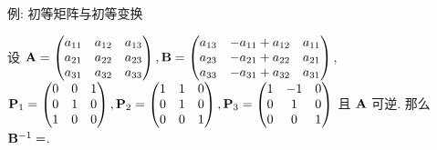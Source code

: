 \begin{frame}{例: 初等矩阵与初等变换}
	\onslide<+->
	\begin{exercise}
		设 ${\mathbf{A}}=\begin{pmatrix}
			a_{11}&a_{12}&a_{13}\\
			a_{21}&a_{22}&a_{23}\\
			a_{31}&a_{32}&a_{33}
		\end{pmatrix},{\mathbf{B}}=\begin{pmatrix}
			a_{13}&-a_{11}+a_{12}&a_{11}\\
			a_{23}&-a_{21}+a_{22}&a_{21}\\
			a_{33}&-a_{31}+a_{32}&a_{31}
		\end{pmatrix}$,\\
		${\mathbf{P}}_1=\begin{pmatrix}
			0&0&1\\0&1&0\\1&0&0
		\end{pmatrix},{\mathbf{P}}_2=\begin{pmatrix}
			1&1&0\\0&1&0\\0&0&1
		\end{pmatrix},{\mathbf{P}}_3=\begin{pmatrix}
			1&-1&0\\0&1&0\\0&0&1
		\end{pmatrix}$ 且 ${\mathbf{A}}$ 可逆.
		那么 ${\mathbf{B}}^{-1}=$.
	\end{exercise}
\end{frame}


